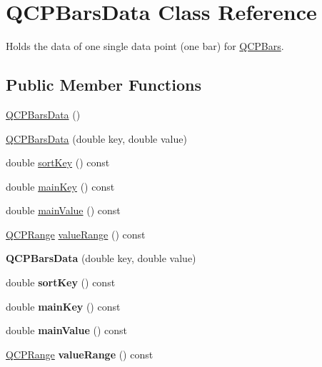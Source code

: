 \hypertarget{class_q_c_p_bars_data}{}\section{Q\+C\+P\+Bars\+Data Class Reference}
\label{class_q_c_p_bars_data}


Holds the data of one single data point (one bar) for \hyperlink{class_q_c_p_bars}{Q\+C\+P\+Bars}.  


\subsection*{Public Member Functions}
\begin{DoxyCompactItemize}
\item 
\hyperlink{class_q_c_p_bars_data_a800794d4c5fea22eeb8bade20798496b}{Q\+C\+P\+Bars\+Data} ()
\item 
\hyperlink{class_q_c_p_bars_data_a4158816a69e2c675885f48afa2b5acc9}{Q\+C\+P\+Bars\+Data} (double key, double value)
\item 
double \hyperlink{class_q_c_p_bars_data_a107d22d84f336bf6e3c3ad0133a5d2f6}{sort\+Key} () const
\item 
double \hyperlink{class_q_c_p_bars_data_a8c1d09e63b0e90a6c1fba56ddeaa8964}{main\+Key} () const
\item 
double \hyperlink{class_q_c_p_bars_data_a360d975e587f9e84259aaec172efb10b}{main\+Value} () const
\item 
\hyperlink{class_q_c_p_range}{Q\+C\+P\+Range} \hyperlink{class_q_c_p_bars_data_acf3e6479dacacd6c81eebe7d4cd62185}{value\+Range} () const
\item 
\mbox{\label{class_q_c_p_bars_data_a4158816a69e2c675885f48afa2b5acc9}} 
{\bfseries Q\+C\+P\+Bars\+Data} (double key, double value)
\item 
\mbox{\label{class_q_c_p_bars_data_a107d22d84f336bf6e3c3ad0133a5d2f6}} 
double {\bfseries sort\+Key} () const
\item 
\mbox{\label{class_q_c_p_bars_data_a8c1d09e63b0e90a6c1fba56ddeaa8964}} 
double {\bfseries main\+Key} () const
\item 
\mbox{\label{class_q_c_p_bars_data_a360d975e587f9e84259aaec172efb10b}} 
double {\bfseries main\+Value} () const
\item 
\mbox{\label{class_q_c_p_bars_data_acf3e6479dacacd6c81eebe7d4cd62185}} 
\hyperlink{class_q_c_p_range}{Q\+C\+P\+Range} {\bfseries value\+Range} () const
\end{DoxyCompactItemize}
